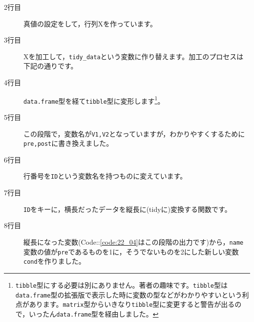 \begin{description}
	\item[2行目] 真値の設定をして，行列Xを作っています。
	\item[3行目] Xを加工して，\verb|tidy_data|という変数に作り替えます。加工のプロセスは下記の通りです。
	\item[4行目] \verb|data.frame|型を経て\verb|tibble|型に変形します\footnote{\verb|tibble|型にする必要は別にありません。著者の趣味です。\verb|tibble|型は\verb|data.frame|型の拡張版で表示した時に変数の型などがわかりやすいという利点があります。\verb|matrix|型からいきなり\verb|tibble|型に変更すると警告が出るので，いったん\verb|data.frame|型を経由しました。}。
	\item[5行目] この段階で，変数名が\verb|V1,V2|となっていますが，わかりやすくするために\verb|pre,post|に書き換えました。
	\item[6行目] 行番号を\verb|ID|という変数名を持つものに変えています。
	\item[7行目] \verb|ID|をキーに，横長だったデータを縦長に(tidyに)変換する関数です。
	\item[8行目] 縦長になった変数(Code::\ref{code:22_04}はこの段階の出力です)から，\verb|name|変数の値が\verb|pre|であるものを1に，そうでないものを2にした新しい変数\verb|cond|を作りました。
\end{description}
